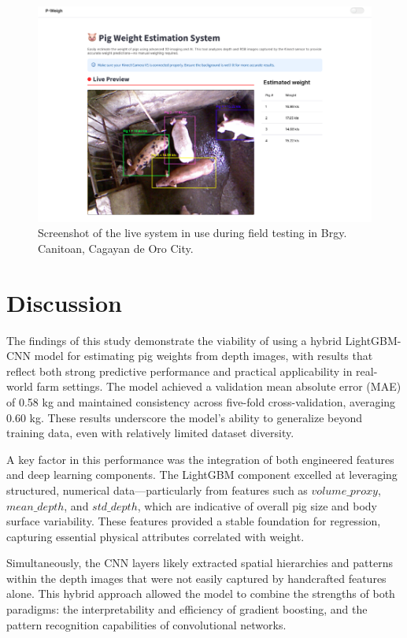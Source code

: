 \begin{figure}[h]
	\centering
	\includegraphics[height=0.45\textheight]{figures/P-Weigh}
	\caption{Screenshot of the live system in use during field testing in Brgy. Canitoan, Cagayan de Oro City.}
	\label{fig:P-Weigh}
\end{figure}

\section{Discussion}

The findings of this study demonstrate the viability of using a hybrid LightGBM-CNN model for estimating pig weights from depth images, with results that reflect both strong predictive performance and practical applicability in real-world farm settings. The model achieved a validation mean absolute error (MAE) of 0.58 kg and maintained consistency across five-fold cross-validation, averaging 0.60 kg. These results underscore the model's ability to generalize beyond training data, even with relatively limited dataset diversity.

A key factor in this performance was the integration of both engineered features and deep learning components. The LightGBM component excelled at leveraging structured, numerical data—particularly from features such as $volume\_proxy$, $mean\_depth$, and $std\_depth$, which are indicative of overall pig size and body surface variability. These features provided a stable foundation for regression, capturing essential physical attributes correlated with weight.

Simultaneously, the CNN layers likely extracted spatial hierarchies and patterns within the depth images that were not easily captured by handcrafted features alone. This hybrid approach allowed the model to combine the strengths of both paradigms: the interpretability and efficiency of gradient boosting, and the pattern recognition capabilities of convolutional networks.

